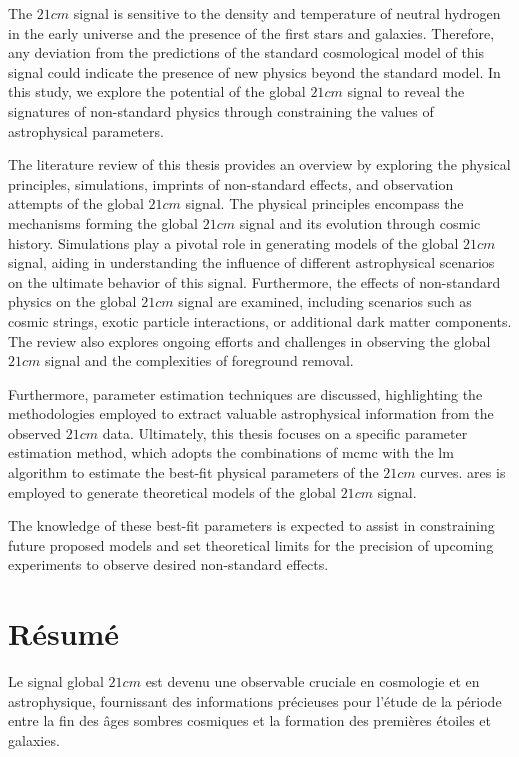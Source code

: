 \documentclass[12pt, TexShade, letterpaper]{report}
\begin{document}
The $21cm$ signal is sensitive to the density and temperature of neutral hydrogen in the early universe and the presence of the first stars and galaxies. Therefore, any deviation from the predictions of the standard cosmological model of this signal could indicate the presence of new physics beyond the standard model.
In this study, we explore the potential of the global $21cm$ signal to reveal the signatures of non-standard physics through constraining the values of astrophysical parameters.\par

The literature review of this thesis provides an overview by exploring the physical principles, simulations, imprints of non-standard effects, and observation attempts of the global $21cm$ signal. The physical principles encompass the mechanisms forming the global $21cm$ signal and its evolution through cosmic history. Simulations play a pivotal role in generating models of the global $21cm$ signal, aiding in understanding the influence of different astrophysical scenarios on the ultimate behavior of this signal. Furthermore, the effects of non-standard physics on the global $21cm$ signal are examined, including scenarios such as cosmic strings, exotic particle interactions, or additional dark matter components. The review also explores ongoing efforts and challenges in observing the global $21cm$ signal and the complexities of foreground removal.\par

Furthermore, parameter estimation techniques are discussed, highlighting the methodologies employed to extract valuable astrophysical information from the observed $21cm$ data. Ultimately, this thesis focuses on a specific parameter estimation method, which adopts the combinations of \gls{mcmc} with the \gls{lm} algorithm to estimate the best-fit physical parameters of the $21cm$ curves. \gls{ares} is employed to generate theoretical models of the global $21cm$ signal.\par

The knowledge of these best-fit parameters is expected to assist in constraining future proposed models and set theoretical limits for the precision of upcoming experiments to observe desired non-standard effects.\par
\chapter*{Résumé}
	\label{chap:frAbstract}
Le signal global $21cm$ est devenu une observable cruciale en cosmologie et en astrophysique, fournissant des informations précieuses pour l'étude de la période entre la fin des âges sombres cosmiques et la formation des premières étoiles et galaxies.\par
\end{document}
